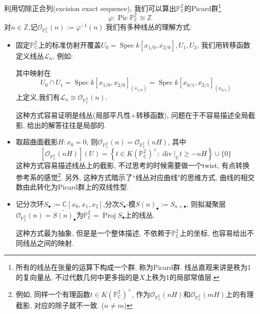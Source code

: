 \documentclass[UTF8,12pt,twoside]{article}
\theoremstyle{definition}
\newcommand{\ZZ}{\mathbb{Z}}  %
\newcommand{\CC}{\mathbb{C}}  %
\newcommand{\PCC}{\mathbb{P}_{\CC}^2} %
\newcommand{\ddiv}{\operatorname{div}} %
\newcommand{\Spec}{\operatorname{Spec}}
\newcommand{\Proj}{\operatorname{Proj}}
\newcommand{\Pic}{\operatorname{Pic}}
\numberwithin{equation}{section}
\begin{document}
利用切除正合列(excision exact sequence)\cite[14.2.8]{vakil2017rising}, 我们可以算出$\mathbb{P}_{\CC}^2$的Picard群\footnote{所有的线丛在张量的运算下构成一个群, 称为Picard群. 线丛直观来讲是秩为1的复向量丛, 不过代数几何中更多指的是$X$上秩为1的局部常值层.}
$$\varphi: \Pic \mathbb{P}_{\CC}^2 \cong \ZZ$$
对$n \in \ZZ$,记$\mathcal{O}_{\mathbb{P}_{\CC}^2}(n):=\varphi^{-1}(n)$.我们有多种线丛的理解方式\cite[14.1,14.2,15.2]{vakil2017rising}: 
\begin{itemize}
	
	\item 固定$\PCC$上的标准仿射开覆盖$U_0=\Spec k[x_{1/0},x_{2/0}],U_1,U_2$, 我们用转移函数定义线丛$\mathcal{L}_n$, 例如:
	
	\begin{center}
	\end{center}
	
	
	
	其中映射在
	$$U_0 \cap U_1= \Spec k[x_{1/0},x_{2/0}]_{(x_{1/0})}=\Spec k[x_{0/1},x_{2/1}]_{(x_{0/1})}$$
	上定义,我们有$\mathcal{L}_n \cong \mathcal{O}_{\mathbb{P}_{\CC}^2}(n)$.
	
	
	这种方式容易证明是线丛(局部平凡性+转移函数), 问题在于不容易描述全局截影, 给出的解答往往是局部的.
	\item 取超曲面截影$H: x_0=0$, 则$\mathcal{O}_{\mathbb{P}_{\CC}^2}(n)=\mathcal{O}_{\mathbb{P}_{\CC}^2}(nH)$, 其中
	$$\left[\mathcal{O}_{\mathbb{P}_{\CC}^2}(nH)\right](U)=\left\{ t \in K(\PCC)^{\times}: \ddiv|_U t \geqslant -nH  \right\} \cup \{0  \}$$
	这种方式容易描述线丛上的截影, 不过思考的时候需要做一个twist, 有点转换参考系的感觉\footnote{例如, 同样一个有理函数$t \in K(\PCC)^{\times}$, 作为$\mathcal{O}_{\mathbb{P}_{\CC}^2}(nH)$和$\mathcal{O}_{\mathbb{P}_{\CC}^2}(mH)$上的有理截影, 对应的除子就不一致. ($n\neq m$)}. 另外, 这种方式暗示了``线丛对应曲线"的思维方式, 曲线的相交数由此转化为Picard群上的双线性型.
	\item 记分次环$S_{\bullet}:=\CC[x_0,x_1,x_2]$,分次$S_{\bullet}$-模$S(n)_{\bullet}:=S_{n+\bullet}$, 则拟凝聚层$\mathcal{O}_{\mathbb{P}_{\CC}^2}(n)=\tilde{S(n)_{\bullet}}$为$\mathbb{P}_{\CC}^2=\Proj S_{\bullet}$上的线丛.
	
	这种方式最为抽象, 但是是一个整体描述, 不依赖于$\PCC$上的坐标, 也容易给出不同线丛之间的映射.
\end{itemize}
\end{document}
